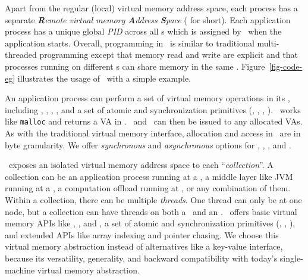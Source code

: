 Apart from the regular (local) virtual memory address space, each process has a separate {\em \textbf{R}emote virtual memory \textbf{A}ddress \textbf{S}pace} ({\em \rspace} for short).
Each application process has a unique global {\em PID} across all \CN{}s which is assigned by \sys\ when the application starts.
Overall, programming in \rspace\ is similar to traditional multi-threaded programming except that memory read and write are explicit and that processes running on different \CN{}s can share memory in the same \rspace.
Figure~\ref{fig-code-eg} illustrates the usage of \sys\ with a simple example.


An application process can perform a set of virtual memory operations in its \rspace,
including \alloc, \sysfree, \sysread, \syswrite, 
and a set of atomic and synchronization primitives (\eg, \syslock, \sysunlock, \fence).
\alloc\ works like \texttt{malloc} and returns a VA in \rspace. \sysread\ and \syswrite\ can then be issued to any allocated VAs.
As with the traditional virtual memory interface, allocation and access in \rspace\ are in byte granularity.
We offer {\em synchronous} and {\em asynchronous} options for \alloc, \sysfree, \sysread, and \syswrite.




\sys\ exposes an isolated virtual memory address space to each ``{\em collection}''.
A collection can be an application process running at a \CN, a middle layer like JVM running at a \CN, a computation offload running at \MN, or any combination of them.
Within a collection, there can be multiple {\em threads}. 
One thread can only be at one node, but a collection can have threads on both a \CN\ and an \MN.
\sys\ offers basic virtual memory APIs like \alloc, \sysread, and \syswrite, 
a set of atomic and synchronization primitives (\tas, \cas, \fence), 
and extended APIs like array indexing and pointer chasing.
We choose this virtual memory abstraction instead of alternatives like a key-value interface,
because its versatility, generality, and backward compatibility with today's single-machine virtual memory abstraction.
\fi



